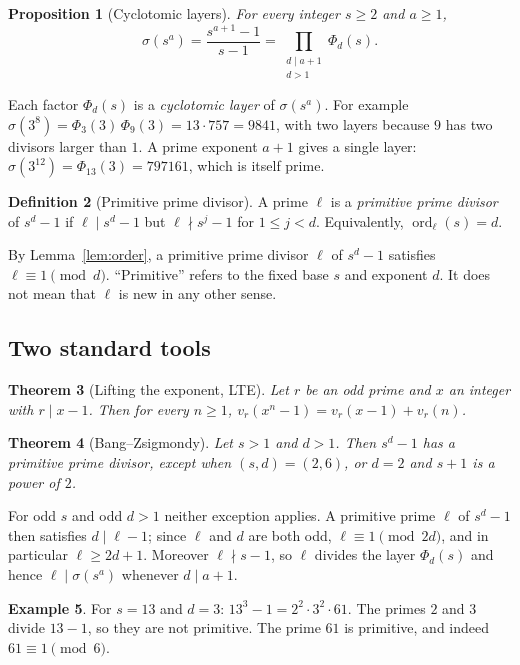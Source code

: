 \documentclass[11pt]{article}
\newtheorem{theorem}{Theorem}[section]
\newtheorem{proposition}[theorem]{Proposition}
\theoremstyle{definition}
\newtheorem{definition}[theorem]{Definition}
\newtheorem{example}[theorem]{Example}
\theoremstyle{remark}
\DeclareMathOperator{\ord}{ord}
\begin{document}
\begin{proposition}[Cyclotomic layers]\label{prop:layers}
For every integer $s\ge2$ and $a\ge1$,
\[
\sigma(s^a)=\frac{s^{a+1}-1}{s-1}=\prod_{\substack{d\mid a+1\\ d>1}}\Phi_d(s).
\]
\end{proposition}

Each factor $\Phi_d(s)$ is a \emph{cyclotomic layer} of $\sigma(s^a)$.  For
example $\sigma(3^8)=\Phi_3(3)\,\Phi_9(3)=13\cdot757=9841$, with two layers
because $9$ has two divisors larger than $1$.  A prime exponent $a+1$ gives a
single layer: $\sigma(3^{12})=\Phi_{13}(3)=797161$, which is itself prime.

\begin{definition}[Primitive prime divisor]
A prime $\ell$ is a \emph{primitive prime divisor} of $s^d-1$ if
$\ell\mid s^d-1$ but $\ell\nmid s^j-1$ for $1\le j<d$.  Equivalently,
$\ord_\ell(s)=d$.
\end{definition}

By Lemma~\ref{lem:order}, a primitive prime divisor $\ell$ of $s^d-1$
satisfies $\ell\equiv1\pmod d$.  ``Primitive'' refers to the fixed base $s$
and exponent $d$.  It does not mean that $\ell$ is new in any other sense.

\subsection{Two standard tools}\label{sec:tools}

\begin{theorem}[Lifting the exponent, LTE]\label{thm:LTE}
Let $r$ be an odd prime and $x$ an integer with $r\mid x-1$.  Then for
every $n\ge1$, $v_r(x^n-1)=v_r(x-1)+v_r(n)$.
\end{theorem}

\begin{theorem}[Bang--Zsigmondy]\label{thm:zsigmondy}
Let $s>1$ and $d>1$.  Then $s^d-1$ has a primitive prime divisor, except
when $(s,d)=(2,6)$, or $d=2$ and $s+1$ is a power of $2$.
\end{theorem}

For odd $s$ and odd $d>1$ neither exception applies.  A primitive prime
$\ell$ of $s^d-1$ then satisfies $d\mid\ell-1$; since $\ell$ and $d$ are both
odd, $\ell\equiv1\pmod{2d}$, and in particular $\ell\ge2d+1$.  Moreover
$\ell\nmid s-1$, so $\ell$ divides the layer $\Phi_d(s)$ and hence
$\ell\mid\sigma(s^a)$ whenever $d\mid a+1$.

\begin{example}
For $s=13$ and $d=3$: $13^3-1=2^2\cdot3^2\cdot61$.  The primes $2$ and $3$
divide $13-1$, so they are not primitive.  The prime $61$ is primitive, and
indeed $61\equiv1\pmod 6$.
\end{example}
\end{document}
